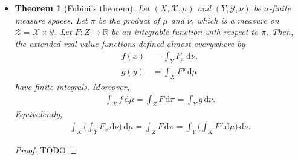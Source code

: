 \documentclass[10pt]{article}
\newtheorem{theorem}[lemma]{Theorem}
\newcommand{\dee}{\mathrm{d}}
\newcommand{\mcal}[1]{\mathcal{#1}}
\newcommand{\Real}{\mathbb{R}}
\begin{document}
\begin{itemize}
  \begin{proof}
    TODO. This requires the monotone class theorem (Theorem~\ref{theorem:monotone-class}).
  \end{proof} 

  \item \begin{theorem}[Fubini's theorem]
    Let $(X,\mcal{X},\mu)$ and $(Y, \mcal{Y}, \nu)$ be $\sigma$-finite measure spaces. Let $\pi$ be the product of $\mu$ and $\nu$, which is a measure on $\mcal{Z} = \mcal{X} \times \mcal{Y}$. Let $F: Z \rightarrow \Real$ be an integrable function with respect to $\pi$. Then, the extended real value functions defined almost everywhere by
    \begin{align*}
      f(x) &= \int_Y F_x\, \dee\nu, \\
      g(y) &= \int_X F^y\, \dee\mu
    \end{align*}
    have finite integrals. Moreover,
    \begin{align*}
      \int_X f\, \dee\mu = \int_Z F\, \dee\pi = \int_Y g\,\dee\nu.
    \end{align*}
    Equivalently,
    \begin{align*}
      \int_X \bigg( \int_Y F_x\, \dee\nu \bigg)\, \dee\mu = \int_Z F\, \dee\pi = \int_Y \bigg( \int_X F^y\, \dee\mu \bigg)\,\dee\nu.
    \end{align*}
  \end{theorem}

  \begin{proof}
    TODO
  \end{proof}
\end{itemize}


  
\end{document}
